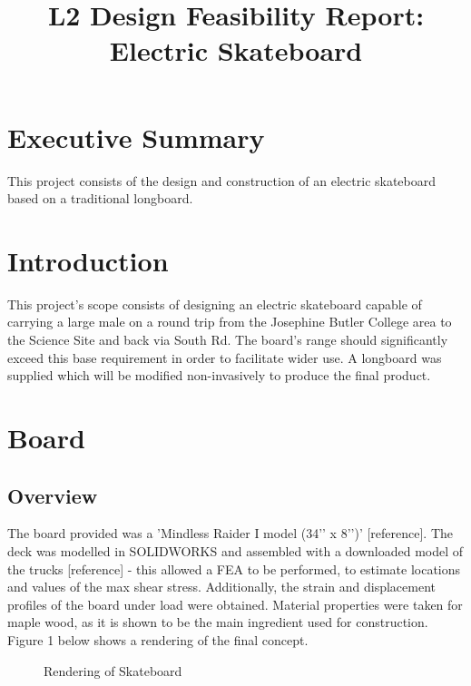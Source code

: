 \documentclass[journal,10pt]{IEEEtran}
\title{ 
\begin{huge}
\textbf{L2 Design Feasibility Report: Electric Skateboard} 
\end{huge} }
\begin{document}
\maketitle
\section{Executive Summary}
        This project consists of the design and construction of an electric skateboard based on a traditional longboard.
    
\section{Introduction}
        This project's scope consists of designing an electric skateboard capable of carrying a large male on a round trip from the Josephine Butler College area to the Science Site and back via South Rd. The board's range should significantly exceed this base requirement in order to facilitate wider use. A longboard was supplied which will be modified non-invasively to produce the final product. 
\section{Board}
    \subsection{Overview}
        The board provided was a 'Mindless Raider I model (34’’ x 8’’)’  [reference]. The deck was modelled in SOLIDWORKS and assembled with a downloaded model of the trucks [reference] - this allowed a FEA to be performed, to estimate locations and values of the max shear stress. Additionally, the strain and displacement profiles of the board under load were obtained. Material properties were taken for maple wood, as it is shown to be the main ingredient used for construction. Figure 1 below shows a rendering of the final concept. 
        \begin{figure}[H]
                \centering
                \caption{
                Rendering of Skateboard}
                \label{fig:Board_Rendering}
            \end{figure} 
\end{document}
